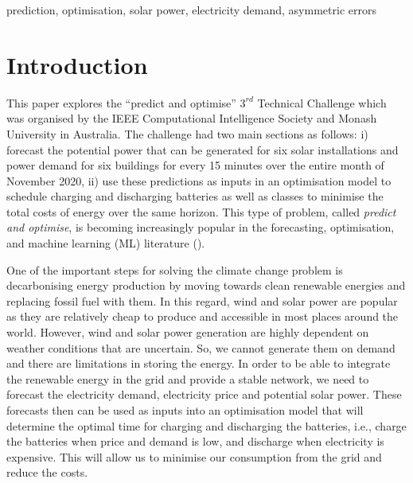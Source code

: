 \documentclass[conference]{IEEEtran}
\begin{document}
\begin{IEEEkeywords}
prediction, optimisation, solar power, electricity demand, asymmetric errors
\end{IEEEkeywords}

\section{Introduction}
This paper explores the ``predict and optimise'' $3^{rd}$ Technical Challenge which was organised by the IEEE Computational Intelligence Society and Monash University in Australia. The challenge had two main sections as follows: i) forecast the potential power that can be generated for six solar installations and power demand for six buildings for every 15 minutes over the entire month of November 2020, ii) use these predictions as inputs in an optimisation model to schedule charging and discharging batteries as well as classes to minimise the total costs of energy over the same horizon. This type of problem, called {\it predict and optimise}, is becoming increasingly popular in the forecasting, optimisation, and machine learning (ML) literature (\cite{abolghasemi2021effectively, Bengio}). 

One of the important steps for solving the climate change problem is decarbonising energy production by moving towards clean renewable energies and replacing fossil fuel with them. In this regard, wind and solar power are popular as they are relatively cheap to produce and accessible in most places around the world. However, wind and solar power generation are highly dependent on weather conditions that are uncertain. So, we cannot generate them on demand and there are limitations in storing the energy. In order to be able to integrate the renewable energy in the grid and provide a stable network, we need to forecast the electricity demand, electricity price and potential solar power. These forecasts then can be used as inputs into an optimisation model that will determine the optimal time for charging and discharging the batteries, i.e., charge the batteries when price and demand is low, and discharge when electricity is expensive. This will allow us to minimise our consumption from the grid and reduce the costs. 
\end{document}

